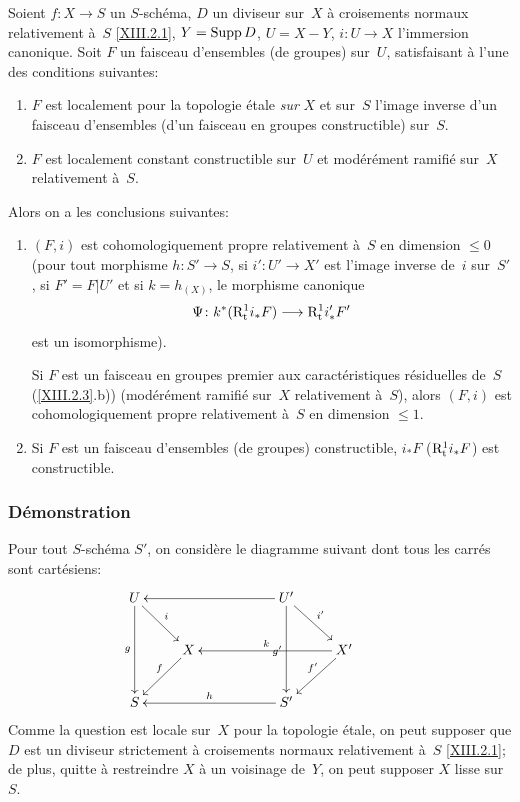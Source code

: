 \begin{theoreme}
\label{XIII.2.4}
Soient
$f\colon X\to S$ un $S$-sch\'ema, $D$ un diviseur sur~$X$
\`a croisements normaux relativement \`a~$S$ \eqref{XIII.2.1},
$Y=\operatorname{Supp} D$, $U=X-Y$, $i\colon U\to X$ l'immersion canonique. Soit $F$
un faisceau d'ensembles (\resp de groupes) sur~$U$, satisfaisant \`a
l'une des conditions suivantes:
\begin{enumerate}
\item[a)] $F$ est localement pour la topologie \'etale \emph{sur}
$X$ et sur~$S$ l'image inverse d'un faisceau d'ensembles (\resp d'un
faisceau en groupes constructible) sur~$S$.
\item[b)] $F$ est localement constant constructible sur~$U$ et
mod\'er\'ement ramifi\'e sur~$X$ relativement \`a~$S$.
\end{enumerate}
Alors on a les conclusions suivantes:
\begin{enumerate}
\item[1)]$(F,i)$ est cohomologiquement propre relativement \`a~$S$
en dimension $\leq 0$ (\resp pour tout morphisme $h\colon S'\to S$, si
$i'\colon U'\to X'$ est l'image inverse de~$i$ sur~$S'$, si $F'=F|U'$
et si $k=h_{(X)}$, le morphisme canonique
$$
\Psi\colon k^*(\R^1_{\tame}i_*F)\to\R^1_{\tame}i_*'F'
$$
est un isomorphisme).

Si $F$ est un faisceau en groupes premier aux caract\'eristiques
r\'esiduelles de~$S$ (\ref{XIII.2.3}.b)) (mod\'er\'ement
ramifi\'e sur~$X$ relativement \`a~$S$), alors $(F,i)$ est
cohomologiquement propre relativement \`a~$S$ en dimension $\leq 1$.
\item[2)]Si $F$ est un faisceau d'ensembles (\resp de groupes)
constructible, $i_*F$ (\resp $\mathrm{R}^1_{\mathrm{t}}i_*F$) est constructible.
\end{enumerate}
\end{theoreme}

\subsubsection*{D\'emonstration}
Pour tout $S$-sch\'ema $S'$, on consid\`ere le diagramme suivant
dont tous les carr\'es sont cart\'esiens:
$$
\xymatrix{{U}\ar[dd]_-g\ar[dr]^-i& & &{U'}\ar[lll]\ar[dd]_{g'}\ar[dr]^-{i'}& \\ &{X}\ar[dl]_{f\mkern-8mu}& & &{X'}\ar[lll]_{k}\ar[dl]_{f'\mkern-10mu}\\{S}& & &{S'}\ar[lll]_-h& & }
$$
Comme
la question est locale sur~$X$ pour la topologie \'etale, on peut
supposer que $D$ est un diviseur strictement \`a croisements normaux
relativement \`a~$S$ \eqref{XIII.2.1}; de plus, quitte \`a
restreindre $X$ \`a un voisinage de~$Y$, on peut supposer $X$ lisse
sur~$S$.

